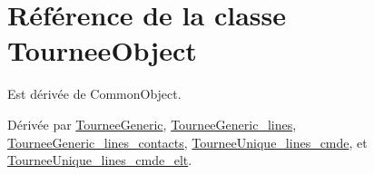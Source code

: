 \hypertarget{classTourneeObject}{}\section{Référence de la classe Tournee\+Object}
\label{classTourneeObject}


Est dérivée de Common\+Object.



Dérivée par \hyperlink{classTourneeGeneric}{Tournee\+Generic}, \hyperlink{classTourneeGeneric__lines}{Tournee\+Generic\+\_\+lines}, \hyperlink{classTourneeGeneric__lines__contacts}{Tournee\+Generic\+\_\+lines\+\_\+contacts}, \hyperlink{classTourneeUnique__lines__cmde}{Tournee\+Unique\+\_\+lines\+\_\+cmde}, et \hyperlink{classTourneeUnique__lines__cmde__elt}{Tournee\+Unique\+\_\+lines\+\_\+cmde\+\_\+elt}.

